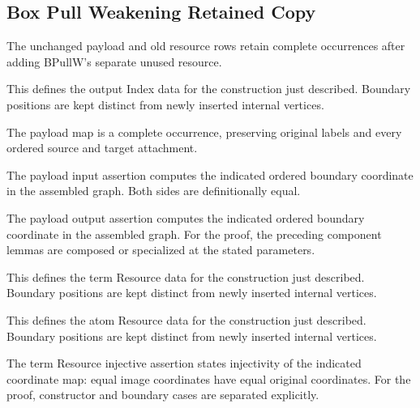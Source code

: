 \subsection{Box Pull Weakening Retained Copy}
The unchanged payload and old resource rows retain complete occurrences after adding BPullW's separate unused resource.

This defines the output Index data for the construction just described. Boundary positions are kept distinct from newly inserted internal vertices.
\par{}

The payload map is a complete occurrence, preserving original labels and every ordered source and target attachment.
\par{}

The payload input assertion computes the indicated ordered boundary coordinate in the assembled graph.
Both sides are definitionally equal.
\par{}

The payload output assertion computes the indicated ordered boundary coordinate in the assembled graph.
For the proof, the preceding component lemmas are composed or specialized at the stated parameters.
\par{}

This defines the term Resource data for the construction just described. Boundary positions are kept distinct from newly inserted internal vertices.
\par{}

This defines the atom Resource data for the construction just described. Boundary positions are kept distinct from newly inserted internal vertices.
\par{}

The term Resource injective assertion states injectivity of the indicated coordinate map: equal image coordinates have equal original coordinates.
For the proof, constructor and boundary cases are separated explicitly.
\par{}

